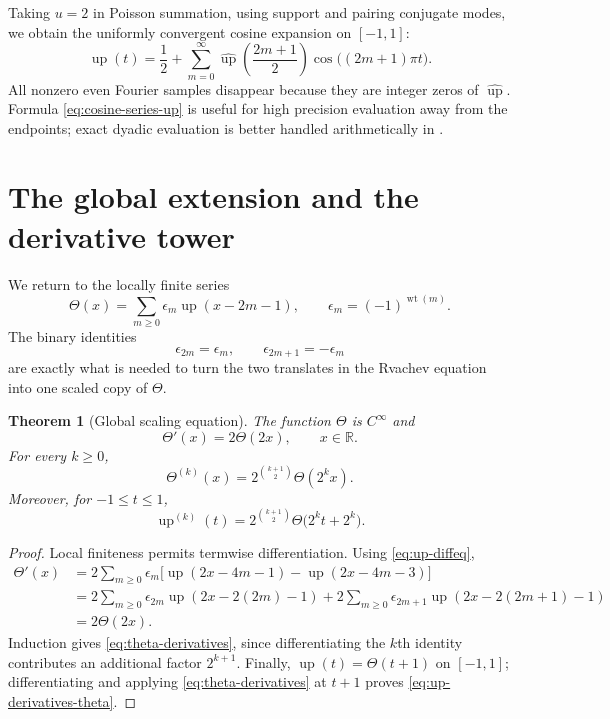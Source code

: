 \documentclass[11pt]{article}
\numberwithin{equation}{section}
\newtheorem{theorem}{Theorem}[section]
\theoremstyle{definition}
\theoremstyle{remark}
\DeclareMathOperator{\wt}{wt}
\newcommand{\R}{\mathbb{R}}
\newcommand{\upf}{\operatorname{up}}
\newcommand{\Th}{\Theta}
\begin{document}
Taking $u=2$ in Poisson summation, using support and pairing conjugate modes,
we obtain the uniformly convergent cosine expansion on $[-1,1]$:
\begin{equation}\label{eq:cosine-series-up}
 \upf(t)=\frac12+\sum_{m=0}^{\infty}
 \widehat{\upf}\left(\frac{2m+1}{2}\right)
 \cos\bigl((2m+1)\pi t\bigr).
\end{equation}
All nonzero even Fourier samples disappear because they are integer zeros of
$\widehat{\upf}$.  Formula \eqref{eq:cosine-series-up} is useful for high
precision evaluation away from the endpoints; exact dyadic evaluation is
better handled arithmetically in .

\section{The global extension and the derivative tower}
\label{sec:global-extension}

We return to the locally finite series
\begin{equation}\label{eq:theta-def}
 \Th(x)=\sum_{m\ge0}\epsilon_m\upf(x-2m-1),
 \qquad \epsilon_m=(-1)^{\wt(m)}.
\end{equation}
The binary identities
\begin{equation}\label{eq:tm-binary}
 \epsilon_{2m}=\epsilon_m,
 \qquad \epsilon_{2m+1}=-\epsilon_m
\end{equation}
are exactly what is needed to turn the two translates in the Rvachev equation
into one scaled copy of $\Th$.

\begin{theorem}[Global scaling equation]\label{thm:theta-scaling}
The function $\Th$ is $C^\infty$ and
\begin{equation}\label{eq:theta-prime}
 \Th'(x)=2\Th(2x),\qquad x\in\R.
\end{equation}
For every $k\ge0$,
\begin{equation}\label{eq:theta-derivatives}
 \Th^{(k)}(x)=2^{\binom{k+1}{2}}\Th(2^kx).
\end{equation}
Moreover, for $-1\le t\le1$,
\begin{equation}\label{eq:up-derivatives-theta}
 \upf^{(k)}(t)=2^{\binom{k+1}{2}}
 \Th\bigl(2^kt+2^k\bigr).
\end{equation}
\end{theorem}

\begin{proof}
Local finiteness permits termwise differentiation.  Using
\eqref{eq:up-diffeq},
\begin{align*}
 \Th'(x)
 &=2\sum_{m\ge0}\epsilon_m
 \bigl[\upf(2x-4m-1)-\upf(2x-4m-3)\bigr]\\
 &=2\sum_{m\ge0}\epsilon_{2m}\upf(2x-2(2m)-1)
   +2\sum_{m\ge0}\epsilon_{2m+1}\upf(2x-2(2m+1)-1)\\
 &=2\Th(2x).
\end{align*}
Induction gives \eqref{eq:theta-derivatives}, since differentiating the
$k$th identity contributes an additional factor $2^{k+1}$.  Finally,
$\upf(t)=\Th(t+1)$ on $[-1,1]$; differentiating and applying
\eqref{eq:theta-derivatives} at $t+1$ proves
\eqref{eq:up-derivatives-theta}.
\end{proof}
\end{document}
